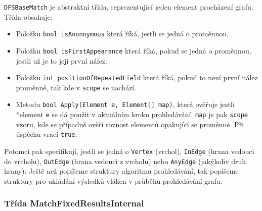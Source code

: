 \texttt{DFSBaseMatch} je abstraktní třída, reprezentující jeden element procházení grafu.
Třída obsahuje:
\begin{itemize}
\item Položku \texttt{bool isAnonnymous} která říká, jestli se jedná o proměnnou.
\item Položku \texttt{bool isFirstAppearance} která říká, pokud se jedná o proměnnou, jestli už je to její první nález.
\item Položku \texttt{int positionOfRepeatedField} která říká, pokud to není první nález proměnné, tak kde v \texttt{scope} se nachází. 
\item Metodu \texttt{bool Apply(Element e, Element[] map)}, která ověřuje jestli \\*element \texttt{e} se dá použit v aktuálním kroku prohledávání.
\texttt{map} je pak \texttt{scope} vzoru, kde se případně ověří rovnost elementů opakující se proměnné. Při úspěchu vrací \texttt{true}.
\end{itemize}
Potomci pak specifikují, jestli se jedná o \texttt{Vertex} (vrchol), \texttt{InEdge} (hrana vedouci do vrcholu), \texttt{OutEdge} (hrana vedouci z vrcholu) nebo \texttt{AnyEdge} (jakýkoliv druh hrany).
Ještě než popíšeme struktury algoritmu prohledávání, tak popíšeme struktury pro ukládání výsledků vláken v průběhu prohledávání grafu.

\subsubsection{Třída MatchFixedResultsInternal}

